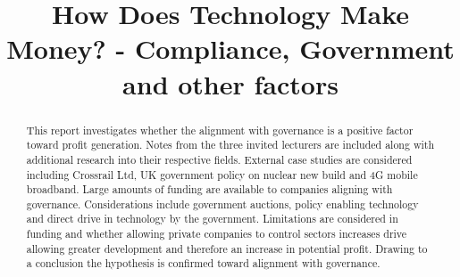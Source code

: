 \documentclass{elec6049Report}     %
\newcommand{\inote}[1] {\todo[inline]{#1}}
\begin{document}
\frontmatter
{}
\title      {How Does Technology Make Money? - Compliance, Government and other factors}

\maketitle
{}
{}
\begin{abstract}
This report investigates whether the alignment with governance is a positive factor toward profit generation.
Notes from the three invited lecturers are included along with additional research into their respective fields.
External case studies are considered including Crossrail Ltd, UK government policy on nuclear new build and 4G mobile broadband.
Large amounts of funding are available to companies aligning with governance.
Considerations include government auctions, policy enabling technology and direct drive in technology by the government.
Limitations are considered in funding and whether allowing private companies to control sectors increases drive allowing greater development and therefore an increase in potential profit. 
Drawing to a conclusion the hypothesis is confirmed toward alignment with governance.

\end{abstract}
\mainmatter





\backmatter


\appendix



 
\end{document}
